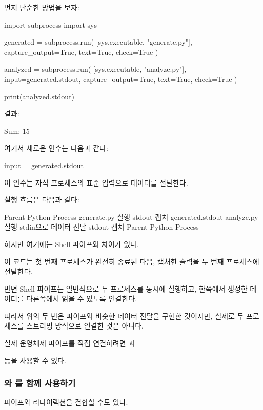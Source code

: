 먼저 단순한 방법을 보자:

\begin{dhkcode}
import subprocess
import sys

generated = subprocess.run(
    [sys.executable, "generate.py"],
    capture_output=True,
    text=True,
    check=True
)

analyzed = subprocess.run(
    [sys.executable, "analyze.py"],
    input=generated.stdout,
    capture_output=True,
    text=True,
    check=True
)

print(analyzed.stdout)
\end{dhkcode}

결과:

\begin{dhkzsh}
Sum: 15
\end{dhkzsh}

여기서 새로운 인수는 다음과 같다:
\begin{dhkcode}
input = generated.stdout
\end{dhkcode}

이 인수는 자식 프로세스의 표준 입력으로 데이터를 전달한다.

실행 흐름은 다음과 같다:
\begin{dhksmry}[centered]
Parent Python Process
\da
generate.py 실행
\da
stdout 캡처
\da
generated.stdout
\da
analyze.py 실행
\da
stdin으로 데이터 전달
\da
stdout 캡처
\da
Parent Python Process
\end{dhksmry}

하지만 여기에는 Shell 파이프와 차이가 있다.

이 코드는 첫 번째 프로세스가 완전히 종료된 다음, 캡처한 출력을 두 번째 프로세스에 전달한다.

반면 Shell 파이프는 일반적으로 두 프로세스를 동시에 실행하고, 한쪽에서 생성한 데이터를 다른쪽에서 읽을 수 있도록 연결한다.

따라서 위의  두 번은 파이프와 비슷한 데이터 전달을 구현한 것이지만, 실제로 두 프로세스를 스트리밍 방식으로 연결한 것은 아니다.

실제 운영체제 파이프를 직접 연결하려면 과 

 등을 사용할 수 있다.

\subsubsection{\zsh{|}와 \zsh{>}를 함께 사용하기}

파이프와 리다이렉션을 결합할 수도 있다.

